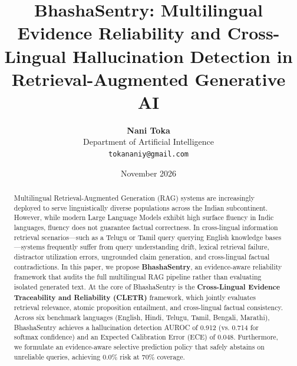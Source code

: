 \documentclass[11pt,a4paper]{article}
\title{\textbf{BhashaSentry: Multilingual Evidence Reliability and Cross-Lingual Hallucination Detection in Retrieval-Augmented Generative AI}}
\author{\textbf{Nani Toka} \\
Department of Artificial Intelligence \\
\texttt{tokananiy@gmail.com}}
\date{November 2026}
\begin{document}
\maketitle

\begin{abstract}
Multilingual Retrieval-Augmented Generation (RAG) systems are increasingly deployed to serve linguistically diverse populations across the Indian subcontinent. However, while modern Large Language Models exhibit high surface fluency in Indic languages, fluency does not guarantee factual correctness. In cross-lingual information retrieval scenarios---such as a Telugu or Tamil query querying English knowledge bases---systems frequently suffer from query understanding drift, lexical retrieval failure, distractor utilization errors, ungrounded claim generation, and cross-lingual factual contradictions. In this paper, we propose \textbf{BhashaSentry}, an evidence-aware reliability framework that audits the full multilingual RAG pipeline rather than evaluating isolated generated text. At the core of BhashaSentry is the \textbf{Cross-Lingual Evidence Traceability and Reliability (CLETR)} framework, which jointly evaluates retrieval relevance, atomic proposition entailment, and cross-lingual factual consistency. Across six benchmark languages (English, Hindi, Telugu, Tamil, Bengali, Marathi), BhashaSentry achieves a hallucination detection AUROC of 0.912 (vs. 0.714 for softmax confidence) and an Expected Calibration Error (ECE) of 0.048. Furthermore, we formulate an evidence-aware selective prediction policy that safely abstains on unreliable queries, achieving 0.0\% risk at 70\% coverage.
\end{abstract}










\end{document}

